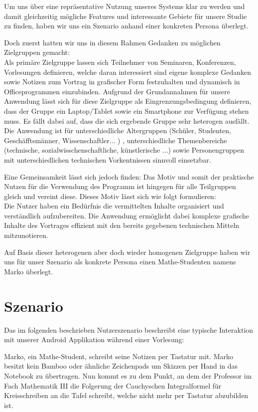 \documentclass{chi-ext}
\begin{document}
Um uns über eine repräsentative Nutzung unseres Systems klar zu werden und damit gleichzeitig mögliche Features und interessante Gebiete für unsere Studie zu finden, haben wir uns ein Szenario anhand einer konkreten Persona überlegt. 

Doch zuerst hatten wir uns in diesem Rahmen Gedanken zu möglichen Zielgruppen gemacht: \\
Als primäre Zielgruppe lassen sich Teilnehmer von Seminaren, Konferenzen, Vorlesungen definieren, welche daran interessiert sind eigene komplexe Gedanken sowie Notizen zum Vortrag in grafischer Form festzuhalten und dynamisch in Officeprogrammen einzubinden.
Aufgrund der Grundannahmen für unsere Anwendung lässt sich für diese Zielgruppe als Eingrenzungsbedingung definieren, dass der Gruppe ein Laptop/Tablet sowie ein Smartphone zur Verfügung stehen muss. 
Es fällt dabei auf, dass die sich ergebende Gruppe sehr heterogen ausfällt. Die Anwendung ist für unterschiedliche Altergruppen (Schüler, Studenten, Geschäfftsmänner, Wissenschaftler... ) , unterschiedliche Themenbereiche (technische, sozialwisschenschaftliche, künstlerische ...) sowie Personengruppen mit unterschiedlichen technischen Vorkentnissen sinnvoll einsetzbar.

Eine Gemeinsamkeit lässt sich jedoch finden: Das Motiv und somit der praktische Nutzen für die Verwendung des Programm ist hingegen für alle Teilgruppen gleich und vereint diese.
Dieses Motiv lässt sich wie folgt formulieren:\\
Die Nutzer haben ein Bedürfnis die vermittelten Inhalte organisiert und verständlich aufzubereiten. Die Anwendung ermöglicht dabei komplexe grafische Inhalte des Vortrages effizient mit den bereits gegebenen technischen Mitteln mitzunotieren.

Auf Basis dieser heterogenen aber doch wieder homogenen Zielgruppe haben wir uns für unser Szenario als konkrete Persona einen Mathe-Studenten namens Marko überlegt.


\section{Szenario}
Das im folgenden beschrieben Nutzerszenario beschreibt eine typische Interaktion mit unserer Android Applikation während einer Vorlesung:


Marko, ein Mathe-Student, schreibt seine Notizen per Tastatur mit. Marko besitzt kein Bamboo oder ähnliche Zeichenpads um Skizzen per Hand in das Notebook zu übertragen. Nun kommt es zu dem Punkt, an dem der Professor im Fach Mathematik III die Folgerung der Cauchyschen Integralformel für Kreisschreiben an die Tafel schreibt, welche nicht mehr per Tastatur abzubilden ist.
\end{document}
